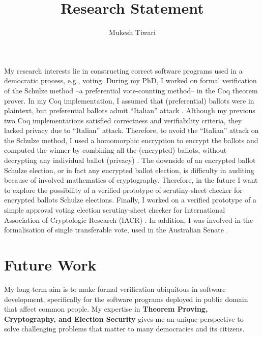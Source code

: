 \documentclass[a4paper]{article}
\title{Research Statement}
\author{Mukesh Tiwari}
\date{}
\begin{document}
\fontsize{12}{15}
\selectfont
\maketitle


My research interests lie in constructing correct software programs used in a democratic process, e.g., 
voting. During my PhD, I worked on formal verification of the Schulze method 
--a preferential vote-counting method-- \cite{10.1007/978-3-319-66107-0_26, bennett2017no} in the Coq theorem prover. 
In my Coq implementation, I assumed that (preferential) ballots were in plaintext, but preferential ballots 
admit ``Italian'' attack \cite{Otten, Benaloh:2009:SSC}. 
Although my previous two Coq implementations \cite{10.1007/978-3-319-66107-0_26, bennett2017no} 
satisfied correctness and verifiability criteria, they lacked privacy due to ``Italian'' attack. 
Therefore, to avoid the ``Italian'' attack on the Schulze method, I used a homomorphic encryption 
to encrypt the ballots and computed the winner by combining all the 
(encrypted) ballots, without decrypting any individual ballot (privacy) \cite{10.1007/978-3-030-41600-3_4}.
The downside of an encrypted ballot Schulze election, 
or in fact any encrypted ballot election, is difficulty in auditing because of involved 
mathematics of cryptography. Therefore, in the future I want to explore the possibility of a 
verified prototype of scrutiny-sheet checker for encrypted ballots Schulze elections.
Finally, I worked on a verified prototype of a simple approval voting election scrutiny-sheet checker for
International Association of Cryptologic Research (IACR) \cite{10.1145/3319535.3354247}. 
In addition, I was involved in the formalisation of single transferable vote, used in the Australian Senate
\cite{10.1007/978-3-030-00419-4_4}.


\section{Future Work}
My long-term aim is to make formal verification ubiquitous in 
software development, specifically for the software programs deployed in public domain
that affect common people.
My expertise in \textbf{Theorem Proving, Cryptography, and Election Security}
gives me an unique perspective to solve challenging problems that matter to many democracies 
and its citizens. 
\end{document}
